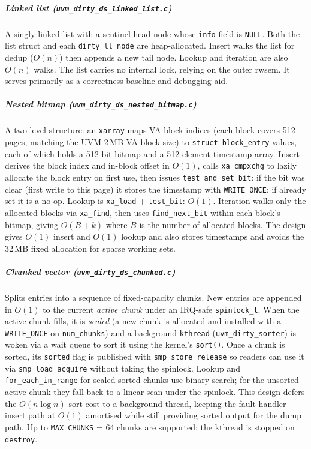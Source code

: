 \subparagraph{Linked list (\texttt{uvm\_dirty\_ds\_linked\_list.c})}
A singly-linked list with a sentinel head node whose \texttt{info} field is
\texttt{NULL}.
Both the list struct and each \texttt{dirty\_ll\_node} are heap-allocated.
Insert walks the list for dedup ($O(n)$) then appends a new tail node.
Lookup and iteration are also $O(n)$ walks.
The list carries no internal lock, relying on the outer rwsem.
It serves primarily as a correctness baseline and debugging aid.

\subparagraph{Nested bitmap (\texttt{uvm\_dirty\_ds\_nested\_bitmap.c})}
A two-level structure: an \texttt{xarray} maps VA-block indices (each block
covers 512 pages, matching the UVM 2\,MB VA-block size) to
\texttt{struct block\_entry} values, each of which holds a 512-bit bitmap and
a 512-element timestamp array.
Insert derives the block index and in-block offset in $O(1)$, calls
\texttt{xa\_cmpxchg} to lazily allocate the block entry on first use, then
issues \texttt{test\_and\_set\_bit}: if the bit was clear (first write to this
page) it stores the timestamp with \texttt{WRITE\_ONCE}; if already set it is
a no-op.
Lookup is \texttt{xa\_load} + \texttt{test\_bit}: $O(1)$.
Iteration walks only the allocated blocks via \texttt{xa\_find}, then uses
\texttt{find\_next\_bit} within each block's bitmap, giving $O(B + k)$ where
$B$ is the number of allocated blocks.
The design gives $O(1)$ insert and $O(1)$ lookup and
also stores timestamps and avoids the 32\,MB fixed allocation for sparse
working sets.

\subparagraph{Chunked vector (\texttt{uvm\_dirty\_ds\_chunked.c})}
Splits entries into a sequence of fixed-capacity chunks.
New entries are appended in $O(1)$ to the current \emph{active chunk} under an
IRQ-safe \texttt{spinlock\_t}.
When the active chunk fills, it is \emph{sealed} (a new chunk is allocated and
installed with a \texttt{WRITE\_ONCE} on \texttt{num\_chunks}) and a background
\texttt{kthread} (\texttt{uvm\_dirty\_sorter}) is woken via a wait queue to
sort it using the kernel's \texttt{sort()}.
Once a chunk is sorted, its \texttt{sorted} flag is published with
\texttt{smp\_store\_release} so readers can use it via \texttt{smp\_load\_acquire}
without taking the spinlock.
Lookup and \texttt{for\_each\_in\_range} for sealed sorted chunks use binary
search; for the unsorted active chunk they fall back to a linear scan under
the spinlock.
This design defers the $O(n \log n)$ sort cost to a background thread,
keeping the fault-handler insert path at $O(1)$ amortised while still
providing sorted output for the dump path.
Up to \texttt{MAX\_CHUNKS} = 64 chunks are supported; the kthread is stopped
on \texttt{destroy}.


